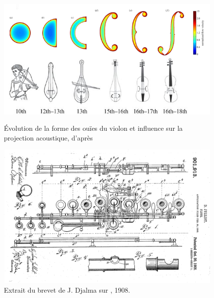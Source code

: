 \begin{figure}[!htbp]
	\captionsetup{format=plain}%
	\centering
	\begin{minipage}[t]{0.48\textwidth}
		\includegraphics[width=\linewidth]{gfx/06_visual_representation/f-hole.png}
		\caption[Évolution de la forme des ouïes du violon et influence sur la projection acoustique]{Évolution de la forme des ouïes du violon et influence sur la projection acoustique, d'après \cite{nia_evolution_2015}}
		\label{fig:visual_representation:fhole}
	\end{minipage}
	\hspace{.02\linewidth}
	\begin{minipage}[t]{0.48\textwidth}
	    \includegraphics[width=\linewidth]{gfx/06_visual_representation/Julliot_patent.png}
		\caption[Brevet sur l'amélioration du clétage des flûtes de Boehm]{Extrait du brevet de J. Djalma sur , 1908.}
		\label{fig:visual_representation:boehm}
	\end{minipage}
\end{figure}


